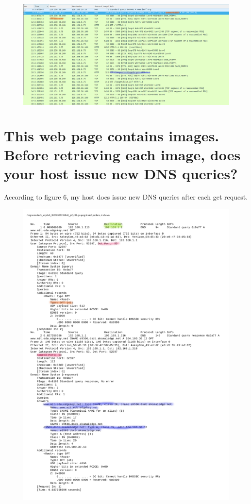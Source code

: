 \documentclass{article}
\begin{document}
\clearpage

\begin{figure}[h!]
\centering
\includegraphics[scale=0.5]{Q9-10.png}
\caption{}
\end{figure}

\section{This web page contains images. Before retrieving each image, does your host
issue new DNS queries?}
According to figure 6, my host does issue new DNS queries after each get request.\\

\clearpage

\begin{figure}[h!]
\centering
\includegraphics[scale=0.5]{Q11-15.pdf}
\caption{}
\end{figure}
\end{document}
